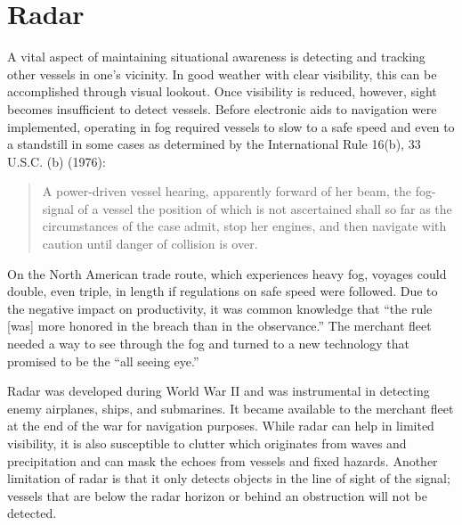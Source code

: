 \documentclass[twoside,symmetric,notoc]{tufte-book}
\begin{document}
\section{Radar}
\par{%
A vital aspect of maintaining situational awareness is detecting and tracking other vessels in one's vicinity. In good weather with clear visibility, this can be accomplished through visual lookout.\cite{Oudet} Once visibility is reduced, however, sight becomes insufficient to detect vessels.\cite[.1in]{1966} Before electronic aids to navigation were implemented, operating in fog required vessels to slow to a safe speed and even to a standstill in some cases as determined by the International Rule 16(b), 33 U.S.C. (b) (1976):
\newpage
\begin{quotation}
A power-driven vessel hearing, apparently forward of her beam, the fog-signal of a vessel the position of which is not ascertained shall so far as the circumstances of the case admit, stop her engines, and then navigate with caution until danger of collision is over.
\end{quotation}
On the North American trade route, which experiences heavy fog, voyages could double, even triple, in length if regulations on safe speed were followed.\cite{Letulle} Due to the negative impact on productivity, it was common knowledge that ``the rule [was] more honored in the breach than in the observance.'' The merchant fleet needed a way to see through the fog and turned to a new technology that promised to be the ``all seeing eye.''
}
\par{%
Radar was developed during World War II and was instrumental in detecting enemy airplanes, ships, and submarines. It became available to the merchant fleet at the end of the war for navigation purposes.\cite{Luse} While radar can help in limited visibility, it is also susceptible to clutter which originates from waves and precipitation and can mask the echoes from vessels and fixed hazards. Another limitation of radar is that it only detects objects in the line of sight of the signal; vessels that are below the radar horizon or behind an obstruction will not be detected.\cite{Bole} 
}
\end{document}
